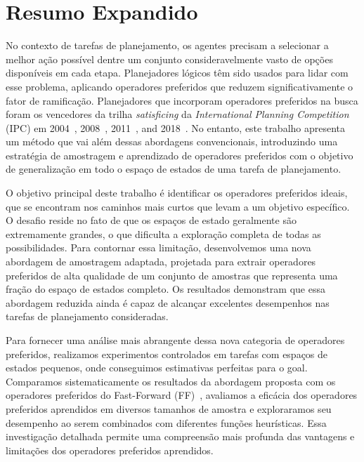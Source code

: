 \documentclass[ppgc,diss,english]{iiufrgs}
\begin{document}


\chapter{Resumo Expandido}
\noindent

No contexto de tarefas de planejamento, os agentes precisam a selecionar a melhor ação possível dentre um conjunto consideravelmente vasto de opções disponíveis em cada etapa. Planejadores lógicos têm sido usados para lidar com esse problema, aplicando operadores preferidos que reduzem significativamente o fator de ramificação. Planejadores que incorporam operadores preferidos na busca foram os vencedores da trilha \emph{satisficing} da \emph{International Planning Competition} (IPC) em 2004~\cite{Helmert/2006}, 2008~\cite{Richter.lama.etal/2010}, 2011~\cite{Richter.lama.etal/2011}, and 2018~\cite{Seipp-fast.etal/2018}.
No entanto, este trabalho apresenta um método que vai além dessas abordagens convencionais, introduzindo uma estratégia de amostragem e aprendizado de operadores preferidos com o objetivo de generalização em todo o espaço de estados de uma tarefa de planejamento.

O objetivo principal deste trabalho é identificar os operadores preferidos ideais, que se encontram nos caminhos mais curtos que levam a um objetivo específico. O desafio reside no fato de que os espaços de estado geralmente são extremamente grandes, o que dificulta a exploração completa de todas as possibilidades. Para contornar essa limitação, desenvolvemos uma nova abordagem de amostragem adaptada, projetada para extrair operadores preferidos de alta qualidade de um conjunto de amostras que representa uma fração do espaço de estados completo. Os resultados demonstram que essa abordagem reduzida ainda é capaz de alcançar excelentes desempenhos nas tarefas de planejamento consideradas.

Para fornecer uma análise mais abrangente dessa nova categoria de operadores preferidos, realizamos experimentos controlados em tarefas com espaços de estados pequenos, onde conseguimos estimativas perfeitas para o goal. Comparamos sistematicamente os resultados da abordagem proposta com os operadores preferidos do Fast-Forward (FF)~\cite{Hoffmann.Nebel/2001, Helmert/2006}, avaliamos a eficácia dos operadores preferidos aprendidos em diversos tamanhos de amostra e exploraramos seu desempenho ao serem combinados com diferentes funções heurísticas. Essa investigação detalhada permite uma compreensão mais profunda das vantagens e limitações dos operadores preferidos aprendidos.
\end{document}
